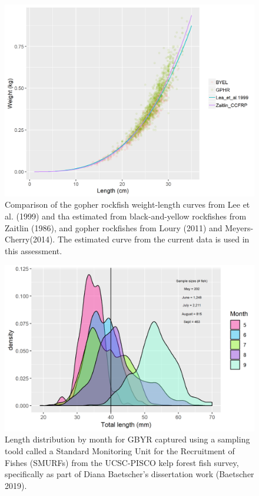 \documentclass[12pt,]{article}
\begin{document}
\begin{figure}
\centering
\includegraphics{Figures/GBY_weight_length.png}
\caption{Comparison of the gopher rockfish weight-length curves from Lee
et al. (1999) and tha estimated from black-and-yellow rockfishes from
Zaitlin (1986), and gopher rockfishes from Loury (2011) and
Meyers-Cherry(2014). The estimated curve from the current data is used
in this assessment. \label{fig:GBY_weight_length}}
\end{figure}

\FloatBarrier

\begin{figure}
\centering
\includegraphics{Figures/SMURF_lengths.png}
\caption{Length distribution by month for GBYR captured using a sampling
toold called a Standard Monitoring Unit for the Recruitment of Fishes
(SMURFs) from the UCSC-PISCO kelp forest fish survey, specifically as
part of Diana Baetscher's dissertation work (Baetscher 2019).
\label{fig:SMURF_lengths}}
\end{figure}
\end{document}
